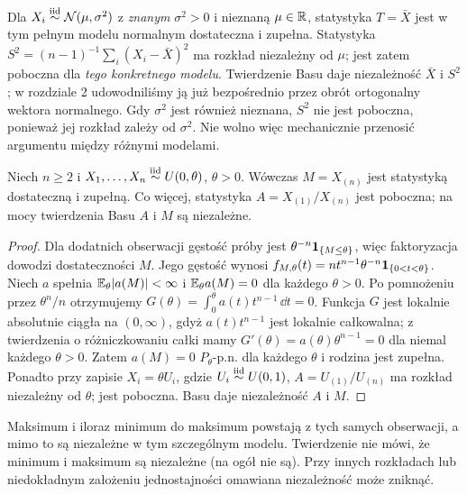 \begin{przyklad}
Dla $X_i\mathrel{\overset{\mathrm{iid}}\sim}\mathcal N(\mu,\sigma^2)$ z \emph{znanym} $\sigma^2>0$
i nieznaną $\mu\in\mathbb R$, statystyka $T=\bar X$ jest
w tym pełnym modelu normalnym dostateczna i zupełna.
Statystyka $S^2=(n-1)^{-1}\sum_i(X_i-\bar X)^2$
ma rozkład niezależny od $\mu$; jest zatem poboczna dla
\emph{tego konkretnego modelu}. Twierdzenie Basu daje
niezależność $\bar X$ i $S^2$; w rozdziale 2 udowodniliśmy
ją już bezpośrednio przez obrót ortogonalny wektora normalnego.
Gdy $\sigma^2$ jest również nieznana, $S^2$ nie jest poboczna,
ponieważ jej rozkład zależy od $\sigma^2$. Nie wolno więc
mechanicznie przenosić argumentu między różnymi modelami.
\end{przyklad}


\begin{twierdzenie}
\label{thm:uniform-complete}
Niech $n\ge2$ i $X_1,\ldots,X_n\mathrel{\overset{\mathrm{iid}}\sim} U(0,\theta)$, $\theta>0$.
Wówczas $M=X_{(n)}$ jest statystyką dostateczną i zupełną.
Co więcej, statystyka $A=X_{(1)}/X_{(n)}$ jest poboczna;
na mocy twierdzenia Basu $A$ i $M$ są niezależne.
\end{twierdzenie}
\begin{proof}
Dla dodatnich obserwacji gęstość próby jest
$\theta^{-n}\mathbf 1_{\{M\le\theta\}}$, więc faktoryzacja dowodzi
dostateczności $M$. Jego gęstość wynosi
$f_{M,\theta}(t)=n t^{n-1}\theta^{-n}\mathbf 1_{\{0<t<\theta\}}$.
Niech $a$ spełnia $\mathbb E_\theta|a(M)|<\infty$ i
$\mathbb E_\theta a(M)=0$ dla każdego $\theta>0$.
Po pomnożeniu przez $\theta^n/n$ otrzymujemy
$G(\theta)=\int_0^\theta a(t)t^{n-1}\,\dd t=0$.
Funkcja $G$ jest lokalnie absolutnie ciągła na $(0,\infty)$,
gdyż $a(t)t^{n-1}$ jest lokalnie całkowalna; z twierdzenia
o różniczkowaniu całki mamy
$G'(\theta)=a(\theta)\theta^{n-1}=0$ dla niemal każdego
$\theta>0$. Zatem $a(M)=0$ $P_\theta$-p.n. dla każdego
$\theta$ i rodzina jest zupełna.
Ponadto przy zapisie $X_i=\theta U_i$, gdzie $U_i\mathrel{\overset{\mathrm{iid}}\sim} U(0,1)$,
$A=U_{(1)}/U_{(n)}$ ma rozkład niezależny od $\theta$;
jest poboczna. Basu daje niezależność $A$ i $M$.
\end{proof}
\begin{uwaga}
Maksimum i iloraz minimum do maksimum powstają z tych samych
obserwacji, a mimo to są niezależne w tym szczególnym modelu.
Twierdzenie nie mówi, że minimum i maksimum są niezależne
(na ogół nie są). Przy innych rozkładach lub niedokładnym
założeniu jednostajności omawiana niezależność może zniknąć.
\end{uwaga}

